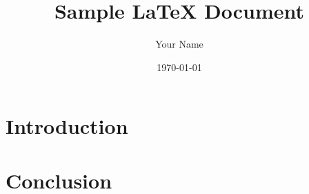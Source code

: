 \documentclass{article}
\title{Sample LaTeX Document}
\author{Your Name}
\date{\today}
\begin{document}
\maketitle

\section{Introduction}
\lipsum[1-2]

\section{Conclusion}
\lipsum[3-4]
\end{document}
